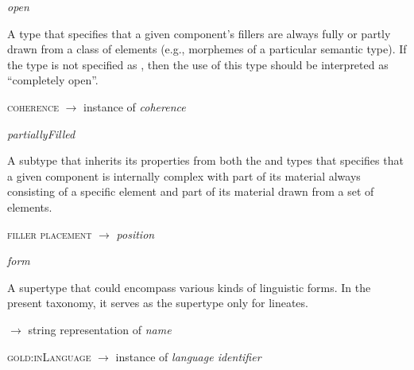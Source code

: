 \begin{ontologytop}
\begin{classlist}
	\item \emph{open}
	\hspace{1em}\parbox[t]{\linegoal}{\footnotesize A type that specifies that a given component's fillers are always fully or partly drawn from a class of elements (e.g., morphemes of a particular semantic type). If the type is not specified as , then the use of this type should be interpreted as ``completely open''.}


		\begin{proplist}

		\item \textsc{coherence} $\rightarrow$ instance of \emph{coherence}

		\end{proplist}

		\begin{classlist}

		\item \emph{partiallyFilled}
		\hspace{1em}\parbox[t]{\linegoal}{\footnotesize A subtype that inherits its properties from both the  and  types that specifies that a given component is internally complex with part of its material always consisting of a specific element and part of its material drawn from a set of elements.}


			\begin{proplist}

			\item \textsc{filler placement} $\rightarrow$  \emph{position}

			\end{proplist}

		\end{classlist}

	\end{classlist}

\item \emph{form}
\hspace{1em}\parbox[t]{\linegoal}{\footnotesize A supertype that could encompass various kinds of linguistic forms. In the present taxonomy, it serves as the supertype only for lineates.}


	\begin{proplist}

	\item \textsc{\name} $\rightarrow$ string representation of \emph{name}

	\item \textsc{{\rm gold:inLanguage}} $\rightarrow$ instance of \emph{language identifier}


\end{proplist}
\end{ontologytop}
